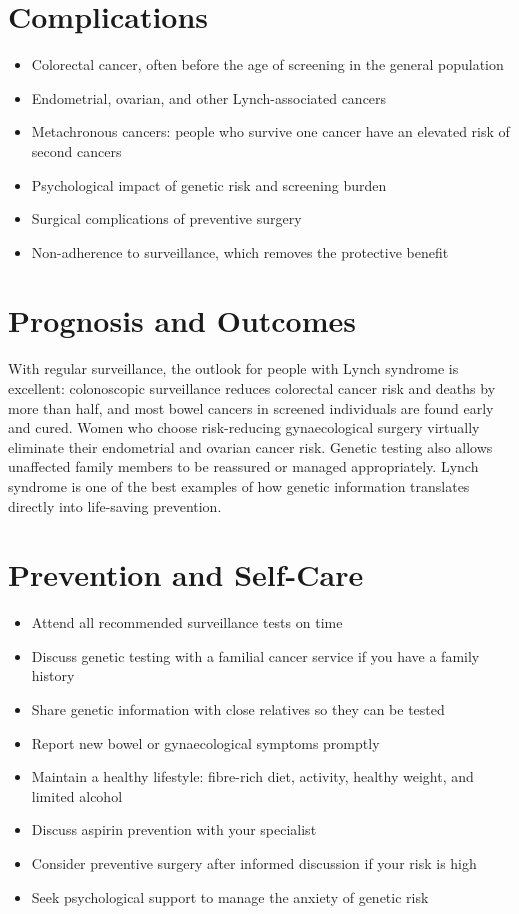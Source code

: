 \section*{Complications}
\begin{itemize}
    \item Colorectal cancer, often before the age of screening in the general population
    \item Endometrial, ovarian, and other Lynch-associated cancers
    \item Metachronous cancers: people who survive one cancer have an elevated risk of second cancers
    \item Psychological impact of genetic risk and screening burden
    \item Surgical complications of preventive surgery
    \item Non-adherence to surveillance, which removes the protective benefit
\end{itemize}

\section*{Prognosis and Outcomes}
With regular surveillance, the outlook for people with Lynch syndrome is excellent: colonoscopic surveillance reduces colorectal cancer risk and deaths by more than half, and most bowel cancers in screened individuals are found early and cured. Women who choose risk-reducing gynaecological surgery virtually eliminate their endometrial and ovarian cancer risk. Genetic testing also allows unaffected family members to be reassured or managed appropriately. Lynch syndrome is one of the best examples of how genetic information translates directly into life-saving prevention.

\section*{Prevention and Self-Care}
\begin{itemize}
    \item Attend all recommended surveillance tests on time
    \item Discuss genetic testing with a familial cancer service if you have a family history
    \item Share genetic information with close relatives so they can be tested
    \item Report new bowel or gynaecological symptoms promptly
    \item Maintain a healthy lifestyle: fibre-rich diet, activity, healthy weight, and limited alcohol
    \item Discuss aspirin prevention with your specialist
    \item Consider preventive surgery after informed discussion if your risk is high
    \item Seek psychological support to manage the anxiety of genetic risk
\end{itemize}

